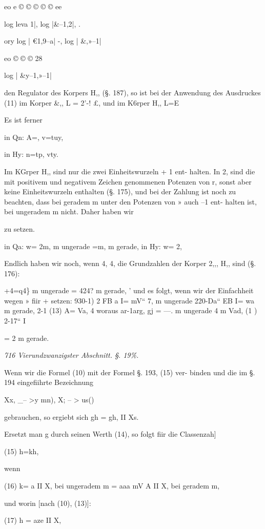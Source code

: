 \documentclass[12pt,a4paper]{article}
\theoremstyle{plain}
\theoremstyle{definition}
\begin{document}
eo e © © © © © ee

log leva 1|, log |\&--1,2|, .

ory log | €1,9--a| -, log | \&,»--1|

eo © © © 28

log | \&y--1,»--1|

den Regulator des Korpers H,, (§. 187), so ist bei der Anwendung des Ausdruckes (11) im Korper \&,, L = 2'-! £, und im K6rper H,, L=E

Es ist ferner

in Qn: A=, v=tuy,

in Hy: n=tp, vty.

Im KGrper H,, sind nur die zwei Einheitswurzeln + 1 ent- halten. In 2, sind die mit positivem und negativem Zeichen genommenen Potenzen von r, sonst aber keine Einheitswurzeln enthalten (§. 175), und bei der Zahlung ist noch zu beachten, dass bei geradem m unter den Potenzen von » auch --1 ent- halten ist, bei ungeradem m nicht. Daher haben wir

zu setzen.

in Qa: w= 2m, m ungerade =m, m gerade, in Hy: w= 2,

Endlich haben wir noch, wenn 4, 4, die Grundzahlen der Korper 2,,, H,, sind (§. 176):

+4=q4\}  \texttrademark m ungerade = 424? m gerade, ' und es folgt, wenn wir der Einfachheit wegen » fiir + setzen: 930-1) 2 FB a I= mV`` 7, m ungerade 220-Da`` EB I= wa m gerade, 2-1 (13) A= Va, 4 woraus ar-1arg, gj = ---. m ungerade 4 m Vad, (1 ) 2-17`` I

= 2 m gerade.

\vspace{0.5\baselineskip}\noindent\textit{716 Vierundzwanzigster Abschnitt. §. 19\%.}\par

Wenn wir die Formel (10) mit der Formel §. 193, (15) ver- binden und die im §. 194 eingefiihrte Bezeichnung

Xx, \_-- >y mn), X; -- > us()

gebrauchen, so ergiebt sich gh = gh, II Xs.

Ersetzt man g durch seinen Werth (14), so folgt fiir die Classenzah]

(15) h=kh,

wenn

(16) k= a II X, bei ungeradem m = aaa mV A II X, bei geradem m,

und worin [nach (10), (13)]:

(17) h = aze II X,
\end{document}
